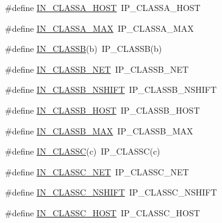 \begin{DoxyCompactItemize}
\item 
\#define \hyperlink{openmote-cc2538_2lwip_2src_2include_2lwip_2inet_8h_a211ecfc0b171c80b7cb7aadc81f6f4bc}{I\+N\+\_\+\+C\+L\+A\+S\+S\+A\+\_\+\+H\+O\+ST}~I\+P\+\_\+\+C\+L\+A\+S\+S\+A\+\_\+\+H\+O\+ST
\item 
\#define \hyperlink{openmote-cc2538_2lwip_2src_2include_2lwip_2inet_8h_a2b2f20dceae36aa9fd14bae05cdaf2fc}{I\+N\+\_\+\+C\+L\+A\+S\+S\+A\+\_\+\+M\+AX}~I\+P\+\_\+\+C\+L\+A\+S\+S\+A\+\_\+\+M\+AX
\item 
\#define \hyperlink{openmote-cc2538_2lwip_2src_2include_2lwip_2inet_8h_a4c6ac301b6e4ea04773f9a50f538fdb1}{I\+N\+\_\+\+C\+L\+A\+S\+SB}(b)~I\+P\+\_\+\+C\+L\+A\+S\+SB(b)
\item 
\#define \hyperlink{openmote-cc2538_2lwip_2src_2include_2lwip_2inet_8h_af54b89d40773f4ee7067f7ae294959fe}{I\+N\+\_\+\+C\+L\+A\+S\+S\+B\+\_\+\+N\+ET}~I\+P\+\_\+\+C\+L\+A\+S\+S\+B\+\_\+\+N\+ET
\item 
\#define \hyperlink{openmote-cc2538_2lwip_2src_2include_2lwip_2inet_8h_a20ccbb620e8382e6806931c88bd83105}{I\+N\+\_\+\+C\+L\+A\+S\+S\+B\+\_\+\+N\+S\+H\+I\+FT}~I\+P\+\_\+\+C\+L\+A\+S\+S\+B\+\_\+\+N\+S\+H\+I\+FT
\item 
\#define \hyperlink{openmote-cc2538_2lwip_2src_2include_2lwip_2inet_8h_a95f8fdfa0a54362c3e9371f98b98f05a}{I\+N\+\_\+\+C\+L\+A\+S\+S\+B\+\_\+\+H\+O\+ST}~I\+P\+\_\+\+C\+L\+A\+S\+S\+B\+\_\+\+H\+O\+ST
\item 
\#define \hyperlink{openmote-cc2538_2lwip_2src_2include_2lwip_2inet_8h_ae51e84d158fa4b02e60179b4b77aaf45}{I\+N\+\_\+\+C\+L\+A\+S\+S\+B\+\_\+\+M\+AX}~I\+P\+\_\+\+C\+L\+A\+S\+S\+B\+\_\+\+M\+AX
\item 
\#define \hyperlink{openmote-cc2538_2lwip_2src_2include_2lwip_2inet_8h_adce550d19c100db32f7c1b62039c36ae}{I\+N\+\_\+\+C\+L\+A\+S\+SC}(c)~I\+P\+\_\+\+C\+L\+A\+S\+SC(c)
\item 
\#define \hyperlink{openmote-cc2538_2lwip_2src_2include_2lwip_2inet_8h_a912fdaf0cebcbc2210348ec94a006d53}{I\+N\+\_\+\+C\+L\+A\+S\+S\+C\+\_\+\+N\+ET}~I\+P\+\_\+\+C\+L\+A\+S\+S\+C\+\_\+\+N\+ET
\item 
\#define \hyperlink{openmote-cc2538_2lwip_2src_2include_2lwip_2inet_8h_a4ec512a20fd799440b84734dd672c34b}{I\+N\+\_\+\+C\+L\+A\+S\+S\+C\+\_\+\+N\+S\+H\+I\+FT}~I\+P\+\_\+\+C\+L\+A\+S\+S\+C\+\_\+\+N\+S\+H\+I\+FT
\item 
\#define \hyperlink{openmote-cc2538_2lwip_2src_2include_2lwip_2inet_8h_a847a8a659ae0d3a4f600486b8c32cb3e}{I\+N\+\_\+\+C\+L\+A\+S\+S\+C\+\_\+\+H\+O\+ST}~I\+P\+\_\+\+C\+L\+A\+S\+S\+C\+\_\+\+H\+O\+ST

\end{DoxyCompactItemize}
